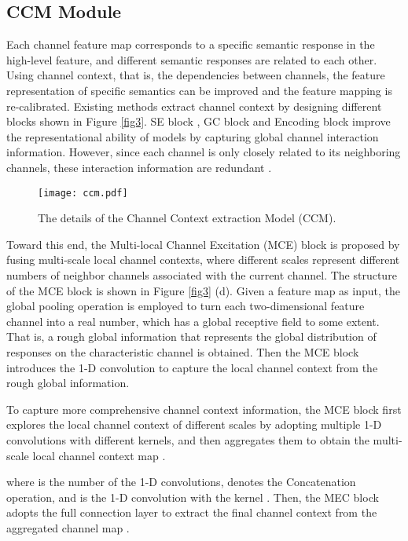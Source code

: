 \documentclass[10pt,journal,cspaper,compsoc]{IEEEtran}
\begin{document}
\subsection{CCM Module}
Each channel feature map corresponds to a specific semantic response in the high-level feature, and different semantic responses are related to each other. Using channel context, that is, the dependencies between channels, the feature representation of specific semantics can be improved and the feature mapping is re-calibrated. Existing methods extract channel context by designing different blocks shown in Figure \ref{fig3}. SE block \cite{hu2018squeeze}, GC block \cite{cao2019gcnet} and Encoding block \cite{zhang2018context} improve the representational ability of models by capturing global channel interaction information. However, since each channel is only closely related to its neighboring channels, these interaction information are redundant \cite{wang2020eca}.
\begin{figure}[t]
\centering
\texttt{[image: ccm.pdf]}
\caption{The details of the Channel Context extraction Model (CCM).}
\label{fig4}
\vspace{-4mm}
\end{figure}
	
Toward this end, the Multi-local Channel Excitation (MCE) block is proposed by fusing multi-scale local channel contexts, where different scales represent different numbers of neighbor channels associated with the current channel. The structure of the MCE block is shown in Figure \ref{fig3} (d). Given a feature map  as input, the global pooling operation is employed to turn each two-dimensional feature channel into a real number, which has a global receptive field to some extent. That is, a rough global information  that  represents the global distribution of responses on the characteristic channel is obtained. Then the MCE block introduces the 1-D convolution to capture the local channel context from the rough global information.
	
To capture more comprehensive channel context information, the MCE block first explores the local channel context of different scales by adopting multiple 1-D convolutions with different kernels, and then aggregates them to obtain the multi-scale local channel context map .

where  is the number of the 1-D convolutions,  denotes the Concatenation operation, and  is the 1-D convolution with the kernel . Then, the MEC block adopts the full connection layer to extract the final channel context  from the aggregated channel map .
\end{document}

